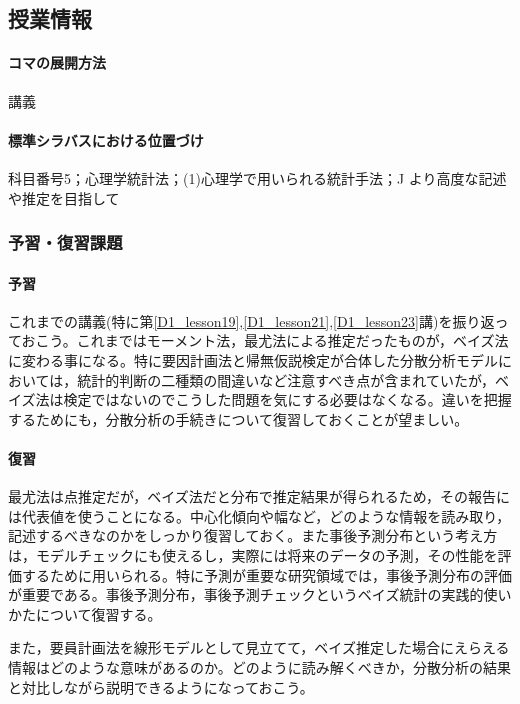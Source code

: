 \subsection{授業情報}
\paragraph{コマの展開方法}
講義
\paragraph{標準シラバスにおける位置づけ}
科目番号5；心理学統計法；(1)心理学で用いられる統計手法；J より高度な記述や推定を目指して
\subsubsection{予習・復習課題}
\paragraph{予習}
これまでの講義(特に第\ref{D1_lesson19},\ref{D1_lesson21},\ref{D1_lesson23}講)を振り返っておこう。これまではモーメント法，最尤法による推定だったものが，ベイズ法に変わる事になる。特に要因計画法と帰無仮説検定が合体した分散分析モデルにおいては，統計的判断の二種類の間違いなど注意すべき点が含まれていたが，ベイズ法は検定ではないのでこうした問題を気にする必要はなくなる。違いを把握するためにも，分散分析の手続きについて復習しておくことが望ましい。
\paragraph{復習}
最尤法は点推定だが，ベイズ法だと分布で推定結果が得られるため，その報告には代表値を使うことになる。中心化傾向や幅など，どのような情報を読み取り，記述するべきなのかをしっかり復習しておく。また事後予測分布という考え方は，モデルチェックにも使えるし，実際には将来のデータの予測，その性能を評価するために用いられる。特に予測が重要な研究領域では，事後予測分布の評価が重要である。事後予測分布，事後予測チェックというベイズ統計の実践的使いかたについて復習する。

また，要員計画法を線形モデルとして見立てて，ベイズ推定した場合にえらえる情報はどのような意味があるのか。どのように読み解くべきか，分散分析の結果と対比しながら説明できるようになっておこう。